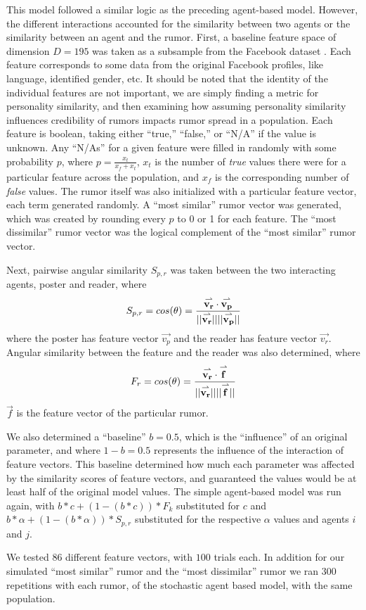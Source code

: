 This model followed a similar logic as the preceding agent-based model. However,
the different interactions accounted for the similarity between two agents or
the similarity between an agent and the rumor. First, a baseline feature space
of dimension $ D = 195 $ was taken as a subsample from the Facebook dataset
\cite{mcauley-2014}. Each feature corresponds to some data from the original
Facebook profiles, like language, identified gender, etc. It should be noted
that the identity of the individual features are not important, we are simply
finding a metric for personality similarity, and then examining how assuming
personality similarity influences credibility of rumors impacts rumor spread in
a population. Each feature is boolean, taking either ``true,'' ``false,'' or
``N/A'' if the value is unknown. Any ``N/As'' for a given feature were filled in
randomly with some probability $ p $, where $ p = \frac{x_{t}}{x_{f} + x_{t}} $, $
x_{t} $ is the number of \textit{true} values there were for a particular
feature across the population, and $ x_{f} $ is the corresponding number of
\textit{false} values. The rumor itself was also initialized with a particular
feature vector, each term generated randomly. A ``most similar'' rumor vector was
generated, which was created by rounding every $ p $ to 0 or 1 for each feature.
The ``most dissimilar'' rumor vector was the logical complement of the ``most
similar'' rumor vector.

Next, pairwise angular similarity $ S_{p,r} $ was taken between the two
interacting agents, poster and reader, where $$ S_{p,r} = cos(\theta) =
\frac{\overset{\rightharpoonup}{\mathbf{v_r}}\cdot\overset{\rightharpoonup}{\mathbf{v_p}}}{\lvert\lvert \overset{\rightharpoonup}{\mathbf{v_r}} \rvert\rvert \lvert\lvert \overset{\rightharpoonup}{\mathbf{v_p}} \rvert\rvert} $$ where the
poster has feature vector $ \vec{v_p} $ and the reader has feature vector $
\vec{v_r} $. Angular similarity between the feature and the reader was also
determined, where $$ F_r  = cos(\theta) =
\frac{\overset{\rightharpoonup}{\mathbf{v_r}}\cdot\overset{\rightharpoonup}{\mathbf{f}}}{\lvert\lvert \overset{\rightharpoonup}{\mathbf{v_r}} \rvert\rvert \lvert\lvert \overset{\rightharpoonup}{\mathbf{f}} \rvert\rvert} $$ $ \vec{f} $ is
the feature vector of the particular rumor.

We also determined a ``baseline'' $ b = 0.5 $, which is the ``influence'' of an
original parameter, and where $ 1 - b = 0.5 $ represents the influence of the
interaction of feature vectors. This baseline determined how much each parameter
was affected by the similarity scores of feature vectors, and guaranteed the
values would be at least half of the original model values. The simple
agent-based model was run again, with $ b*c + (1-(b*c))*F_k $ substituted for $
c $ and $ b*\alpha + (1-(b*\alpha))*S_{p,r} $ substituted for the respective $
\alpha $ values and agents $ i $ and $ j $.

We tested $ 86 $ different feature vectors, with $ 100 $ trials each. In
addition for our simulated ``most similar'' rumor and the ``most dissimilar''
rumor  we ran $ 300 $ repetitions with each rumor, of the stochastic agent based
model, with the same population.
